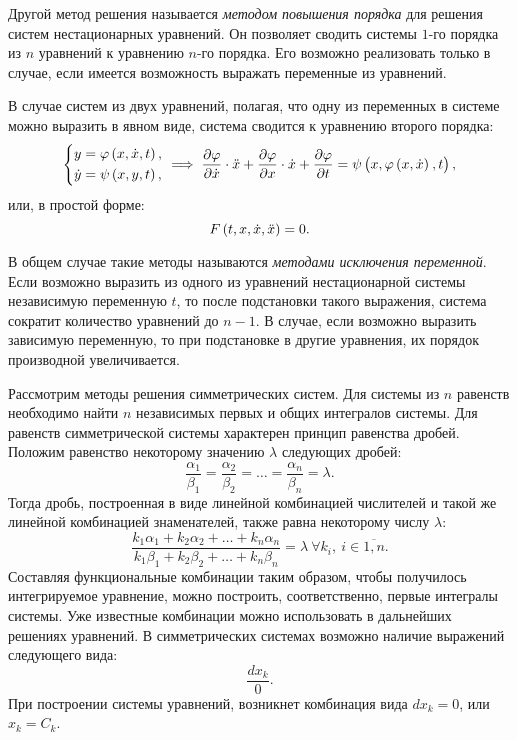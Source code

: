 	Другой метод решения называется \textit{методом повышения порядка} для решения систем нестационарных уравнений. Он позволяет сводить системы $1$-го порядка из $n$ уравнений к уравнению $n$-го порядка. Его возможно реализовать только в случае, если имеется возможность выражать переменные из уравнений.

	В случае систем из двух уравнений, полагая, что одну из переменных в системе можно выразить в явном виде, система сводится к уравнению второго порядка:
	\[ \left\lbrace \begin{split}
		y &= \varphi\pares{x, \dot{x}, t}, \\
		\dot{y} &= \psi\pares{x, y, t},
	\end{split} \right. \implies \dpart{\varphi}{\dot{x}} \cdot \ddot{x} + \dpart{\varphi}{x} \cdot \dot{x} + \dpart{\varphi}{t} = \psi\pares{x, \varphi\pares{x, \dot{x}}\phn, t}, \]
	или, в простой форме:
	\[ F\left( t, x, \dot{x}, \ddot{x} \right) = 0. \]

	В общем случае такие методы называются \textit{методами исключения переменной}. Если возможно выразить из одного из уравнений нестационарной системы независимую переменную $t$, то после подстановки такого выражения, система сократит количество уравнений до $n-1$. В случае, если возможно выразить зависимую переменную, то при подстановке в другие уравнения, их порядок производной увеличивается. 

	Рассмотрим методы решения симметрических систем. Для системы из $n$ равенств необходимо найти $n$ независимых первых и общих интегралов системы. Для равенств симметрической системы характерен принцип равенства дробей. Положим равенство некоторому значению $\lambda$ следующих дробей:
	\[ \frac{\alpha_1}{\beta_1} = \frac{\alpha_2}{\beta_2} = \dots = \frac{\alpha_n}{\beta_n} = \lambda. \]
	Тогда дробь, построенная в виде линейной комбинацией числителей и такой же линейной комбинацией знаменателей, также равна некоторому числу $\lambda$:
	\[ \frac{k_1 \alpha_1 + k_2 \alpha_2 + \dots + k_n \alpha_n}{k_1 \beta_1 + k_2 \beta_2 + \dots + k_n \beta_n} = \lambda ~ \forall k_i, ~ i \in \overline{1, n}. \]
	Составляя функциональные комбинации таким образом, чтобы получилось интегрируемое уравнение, можно построить, соответственно, первые интегралы системы. Уже известные комбинации можно использовать в дальнейших решениях уравнений. В симметрических системах возможно наличие выражений следующего вида:
	\[ \frac{dx_k}{0}. \]
	При построении системы уравнений, возникнет комбинация вида $dx_k = 0$, или $x_k = C_k$.

